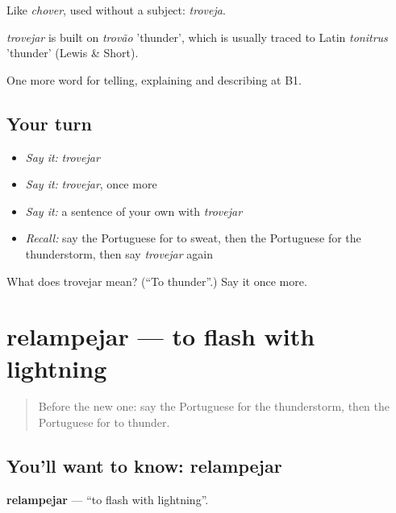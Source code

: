 Like \emph{chover}, used without a subject: \emph{troveja}.

\begin{cousinweb}
\emph{trovejar} is built on \emph{trovão} 'thunder', which is usually traced to Latin \emph{tonitrus} 'thunder' (Lewis \& Short).
\end{cousinweb}

\begin{grammarlens}[title={What you've built}]
One more word for telling, explaining and describing at B1.
\end{grammarlens}

\subsection*{Your turn}
\begin{itemize}
\raggedright
  \item \emph{Say it:} \emph{trovejar}
  \item \emph{Say it:} \emph{trovejar}, once more
  \item \emph{Say it:} a sentence of your own with \emph{trovejar}
  \item \emph{Recall:} say the Portuguese for to sweat, then the Portuguese for the thunderstorm, then say \emph{trovejar} again
\end{itemize}

\begin{tcolorbox}[breakable,colback=teal!4,colframe=teal!35!black,title={Before you move on}]
What does trovejar mean? (\textquotedblleft{}To thunder\textquotedblright{}.) Say it once more.
\end{tcolorbox}
\section[relampejar]{relampejar — to flash with lightning}

\label{lesson:PT-C463-relampejar}



\begin{quote}
Before the new one: say the Portuguese for the thunderstorm, then the Portuguese for to thunder.
\end{quote}

\subsection*{You'll want to know: relampejar}
\textbf{relampejar} — \textquotedblleft{}to flash with lightning\textquotedblright{}.

